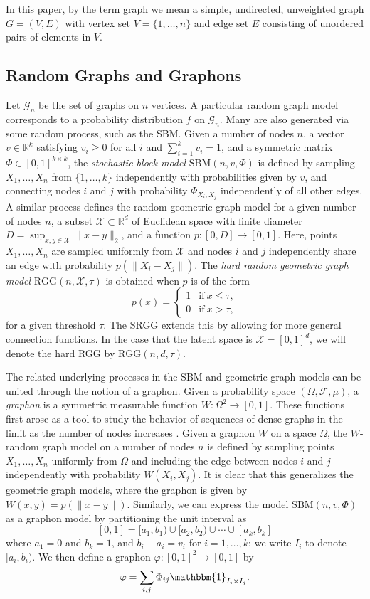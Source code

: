 \documentclass{svproc}
\newcommand{\1}{\mathbbm{1}}
\renewcommand{\phi}{\varphi}
\newcommand{\rr}{\mathbb{R}}
\newcommand{\set}[1]{\{ #1\}}
\begin{document}
In this paper, by the term graph we mean a simple, undirected, unweighted graph $G = (V,E)$ with vertex set $V = \{1,\dots,n\}$ and edge set $E$ consisting of unordered pairs of elements in $V$. 

\subsection{Random Graphs and Graphons}
Let $\mathcal{G}_n$ be the set of graphs on $n$ vertices. A particular random graph model corresponds to a probability distribution $f$ on $\mathcal{G}_n$. Many are also generated via some random process, such as the SBM. Given a number of nodes $n$, a vector $v\in\rr^k$ satisfying $v_i\geq 0$ for all $i$ and $\sum_{i=1}^k v_i = 1$, and a symmetric matrix $\Phi\in [0,1]^{k\times k}$, the \emph{stochastic block model} $\mathrm{SBM}(n,v,\Phi)$ is defined by sampling $X_1,\dots,X_n$ from $\set{1,\dots,k}$ independently with probabilities given by $v$, and connecting nodes $i$ and $j$ with probability $\Phi_{X_i,X_j}$ independently of all other edges. A similar process defines the random geometric graph model for a given number of nodes $n$, a subset $\mathcal{X}\subset\mathbb{R}^d$ of Euclidean space with finite diameter $D = \sup_{x,y\in \mathcal{X}}\|x-y\|_2$, and a function $p:[0,D]\to[0,1]$. Here, points $X_1,\dots, X_n$ are sampled uniformly from $\mathcal{X}$ and nodes $i$ and $j$ independently share an edge with probability $p(\|X_i - X_j\|)$. The \emph{hard random geometric graph model} $\mathrm{RGG}(n,\mathcal{X},\tau)$ is obtained when $p$ is of the form
\[p(x) = \begin{cases}1 & \text{if}~x\leq\tau,\\ 0 & \text{if}~x>\tau,\end{cases}\]
for a given threshold $\tau$. The SRGG extends this by allowing for more general connection functions. In the case that the latent space is $\mathcal{X}=[0,1]^d$, we will denote the hard RGG by $\mathrm{RGG}(n,d,\tau)$.

The related underlying processes in the SBM and geometric graph models can be united through the notion of a graphon. Given a probability space $(\Omega, \mathcal{F},\mu)$, a \emph{graphon} is a symmetric measurable function $W:\Omega^2\to[0,1]$. These functions first arose as a tool to study the behavior of sequences of dense graphs in the limit as the number of nodes increases \cite{lovasz2012}. Given a graphon $W$ on a space $\Omega$, the $W$-random graph model on a number of nodes $n$ is defined by sampling points $X_1,\dots,X_n$ uniformly from $\Omega$ and including the edge between nodes $i$ and $j$ independently with probability $W(X_i,X_j)$. It is clear that this generalizes the geometric graph models, where the graphon is given by $W(x,y) = p(\|x-y\|)$. Similarly, we can express the model $\mathrm{SBM}(n,v,\Phi)$ as a graphon model by partitioning the unit interval as
\[[0,1] =[a_1,b_1)\cup [a_2,b_2)\cup\cdots\cup [a_k,b_k]\]
where $a_1=0$ and $b_k=1$, and $b_i-a_i=v_i$ for $i=1,\dots,k$; we write $I_i$ to denote $[a_i,b_i)$. We then define a graphon $\phi:[0,1]^2\to[0,1]$ by
\begin{equation}\label{sbm_graphon}\phi = \sum_{i,j}\Phi_{ij}\1_{I_i\times I_j}.\end{equation}
\end{document}
